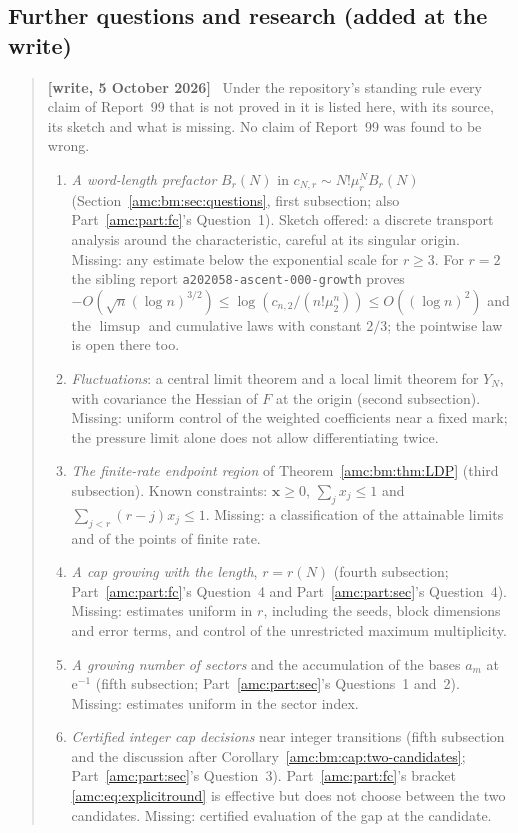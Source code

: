 \documentclass[11pt,letterpaper]{article}
\theoremstyle{remark}\newtheorem{remark}[theorem]{Remark}
\newcommand{\ee}{\mathrm e}
\newcommand{\bx}{\boldsymbol x}
\newenvironment{writenotedated}[1]{\par\smallskip\begin{quote}\small\textbf{[write, #1]}\ }{\end{quote}\smallskip}
\newcommand{\repopath}[1]{\nolinkurl{#1}}
\begin{document}
\subsection{Further questions and research (added at the write)}\label{amc:bm:sec:further}
\begin{writenotedated}{5 October 2026}
Under the repository's standing rule every claim of Report~99 that is not proved in it is listed here, with its source, its sketch and what is missing. No claim of Report~99 was found to be wrong.
\begin{enumerate}
\item \emph{A word-length prefactor} $B_r(N)$ in $c_{N,r}\sim N!\mu_r^NB_r(N)$ (Section~\ref{amc:bm:sec:questions}, first subsection; also Part~\ref{amc:part:fc}'s Question~1). Sketch offered: a discrete transport analysis around the characteristic, careful at its singular origin. Missing: any estimate below the exponential scale for $r\ge3$. For $r=2$ the sibling report \repopath{a202058-ascent-000-growth} proves $-O(\sqrt n(\log n)^{3/2})\le\log(c_{n,2}/(n!\mu_2^n))\le O((\log n)^2)$ and the $\limsup$ and cumulative laws with constant $2/3$; the pointwise law is open there too.
\item \emph{Fluctuations}: a central limit theorem and a local limit theorem for $Y_N$, with covariance the Hessian of $F$ at the origin (second subsection). Missing: uniform control of the weighted coefficients near a fixed mark; the pressure limit alone does not allow differentiating twice.
\item \emph{The finite-rate endpoint region} of Theorem~\ref{amc:bm:thm:LDP} (third subsection). Known constraints: $\bx\ge0$, $\sum_jx_j\le1$ and $\sum_{j<r}(r-j)x_j\le1$. Missing: a classification of the attainable limits and of the points of finite rate.
\item \emph{A cap growing with the length}, $r=r(N)$ (fourth subsection; Part~\ref{amc:part:fc}'s Question~4 and Part~\ref{amc:part:sec}'s Question~4). Missing: estimates uniform in $r$, including the seeds, block dimensions and error terms, and control of the unrestricted maximum multiplicity.
\item \emph{A growing number of sectors} and the accumulation of the bases $a_m$ at $\ee^{-1}$ (fifth subsection; Part~\ref{amc:part:sec}'s Questions~1 and~2). Missing: estimates uniform in the sector index.
\item \emph{Certified integer cap decisions} near integer transitions (fifth subsection and the discussion after Corollary~\ref{amc:bm:cap:two-candidates}; Part~\ref{amc:part:sec}'s Question~3). Part~\ref{amc:part:fc}'s bracket \eqref{amc:eq:explicitround} is effective but does not choose between the two candidates. Missing: certified evaluation of the gap at the candidate.

\end{enumerate}
\end{writenotedated}
\end{document}
